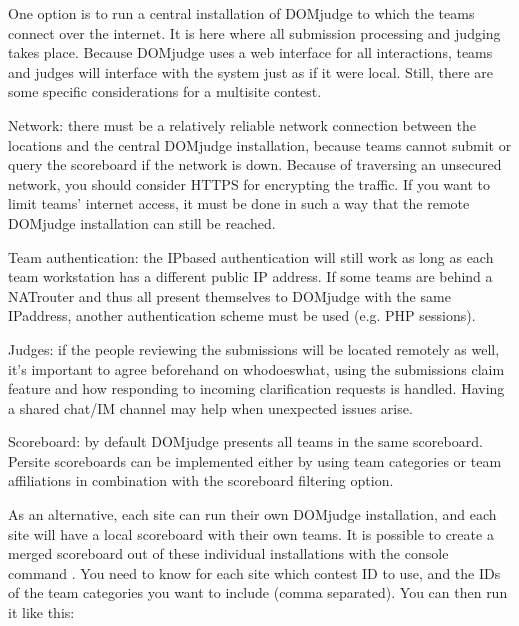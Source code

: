 \documentclass[a4paper,10pt,english,openany]{sphinxmanual}
\begin{document}
\sphinxAtStartPar
One option is to run a central installation of
DOMjudge to which the teams connect over the internet. It is here where
all submission processing and judging takes place. Because DOMjudge uses a web
interface for all interactions, teams and judges will interface with the system
just as if it were local.  Still, there are some specific considerations for a
multi\sphinxhyphen{}site contest.

\sphinxAtStartPar
Network: there must be a relatively reliable network connection between the
locations and the central DOMjudge installation, because teams cannot submit or
query the scoreboard if the network is down. Because of traversing an unsecured
network, you should consider HTTPS for encrypting the traffic.  If you
want to limit teams’ internet access, it must be done in such a way that the remote
DOMjudge installation can still be reached.

\sphinxAtStartPar
Team authentication: the IP\sphinxhyphen{}based authentication will still work as long as
each team workstation has a different public IP address. If some teams are
behind a NAT\sphinxhyphen{}router and thus all present themselves to DOMjudge with the same
IP\sphinxhyphen{}address, another authentication scheme must be used (e.g. PHP sessions).

\sphinxAtStartPar
Judges: if the people reviewing the submissions will be located remotely as
well, it’s important to agree beforehand on who\sphinxhyphen{}does\sphinxhyphen{}what, using the
submissions claim feature and how responding to incoming clarification requests
is handled. Having a shared chat/IM channel may help when unexpected issues
arise.

\sphinxAtStartPar
Scoreboard: by default DOMjudge presents all teams in the same scoreboard.
Per\sphinxhyphen{}site scoreboards can be implemented either by using team categories or
team affiliations in combination with the scoreboard filtering option.

\sphinxAtStartPar
As an alternative, each site can run their own DOMjudge installation, and
each site will have a local scoreboard with their own teams. It is possible
to create a merged scoreboard out of these individual installations with the
console command . You need to know for each site which
contest ID to use, and the IDs of the team categories you want to include
(comma separated). You can then run it like this:
\end{document}
